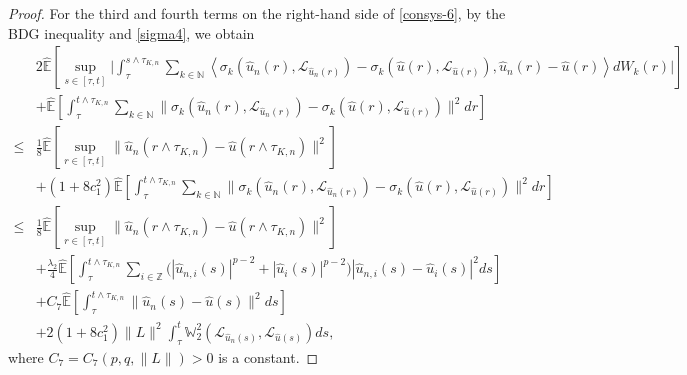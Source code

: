 \documentclass[11pt]{article}
\numberwithin{equation}{section}
\theoremstyle{plain}
\begin{document}
\begin{proof}
  For the third and fourth terms on the right-hand side of \eqref{consys-6},
  by 
  the BDG inequality and \eqref{sigma4}, we obtain
  \begin{align}\label{consys-9}
         & 2 \widehat{\mathbb{E}}
                   \left[ \sup_{s \in [\tau,t]}
                          \Big| \int_{\tau}^{s \wedge \tau_{K,n}}
                                   \sum_{k \in \mathbb{N} }
                                      \left\langle \sigma_k(\hat{u}_n(r),\mathcal{L}_{\hat{u}_n(r)}) - \sigma_k(\hat{u}(r),\mathcal{L}_{\hat{u}(r)}),
                                                   \hat{u}_n(r) - \hat{u}(r)
                                      \right\rangle dW_k(r)
                          \Big|
                   \right]  \nonumber\\
          & + \widehat{\mathbb{E}}
                 \left[ \int_{\tau}^{t \wedge \tau_{K,n}}
                           \sum_{k \in \mathbb{N} }
                              \|\sigma_k(\hat{u}_n(r),\mathcal{L}_{\hat{u}_n(r)}) - \sigma_k(\hat{u}(r),\mathcal{L}_{\hat{u}(r)})\|^2 dr
                 \right]  \nonumber\\
     \le & \frac{1}{8} \widehat{\mathbb{E}}
                        \left[ \sup_{r \in [\tau, t]}
                                   \| \hat{u}_n(r \wedge \tau_{K,n}) - \hat{u}(r \wedge \tau_{K,n}) \|^2
                        \right]  \nonumber\\
          & + \left( 1 + 8 c_1^2 \right)
              \widehat{\mathbb{E}}
                    \left[ \int_{\tau}^{t \wedge \tau_{K,n}}
                              \sum_{k \in \mathbb{N} }
                                    \| \sigma_k(\hat{u}_n(r),\mathcal{L}_{\hat{u}_n(r)}) - \sigma_k(\hat{u}(r),\mathcal{L}_{\hat{u}(r)})\|^2 dr
                    \right]  \nonumber\\
     \le & \frac{1}{8} \widehat{\mathbb{E}}
                        \left[ \sup_{r \in [\tau, t]}
                                   \| \hat{u}_n(r \wedge \tau_{K,n}) - \hat{u}(r \wedge \tau_{K,n}) \|^2
                        \right]  \nonumber\\
          & + \frac{\lambda_2}{4} \widehat{\mathbb{E}}
                  \left[ \int_{\tau}^{t \wedge \tau_{K,n}}
                            \sum_{i \in \mathbb{Z}}
                                \Big( |\hat{u}_{n,i}(s)|^{p-2} + |\hat{u}_i(s)|^{p-2} \Big)
                                | \hat{u}_{n,i}(s) - \hat{u}_i(s) |^2 ds
                  \right]  \nonumber\\
          & + C_7 
                 \widehat{\mathbb{E}}
                    \left[ \int_{\tau}^{t \wedge \tau_{K,n}}
                                 \|\hat{u}_n(s) - \hat{u}(s)\|^2 ds
                    \right]  \nonumber\\
          & + 2 \left( 1 + 8 c_1^2 \right) \| L \|^2
                \int_{\tau}^{t} \mathbb{W}_2^2(\mathcal{L}_{\hat{u}_n(s)},\mathcal{L}_{\hat{u}(s)}) ds,
 \end{align}
 where $C_7 = C_7(p, q, \|L\|) > 0$ is a constant.
 

\end{proof}
\end{document}
